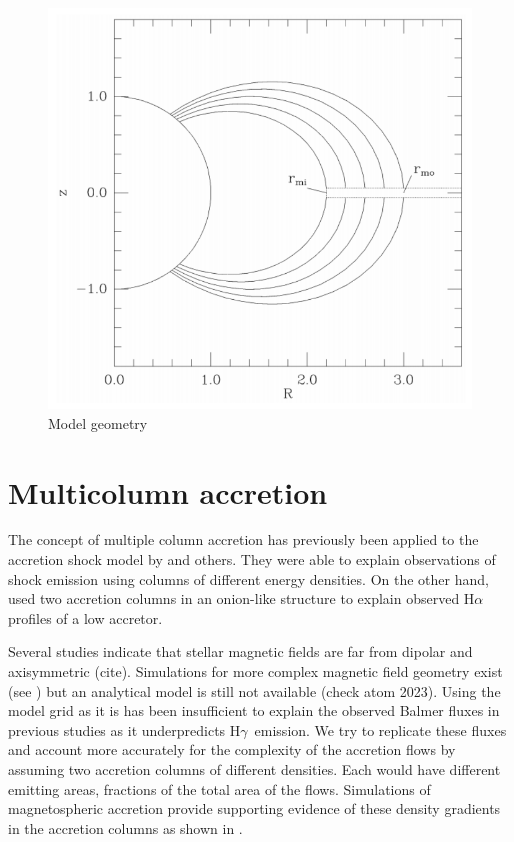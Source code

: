 \documentclass[twocolumn,linenumbers]{aastex631}
\newcommand{\halpha}{H$\alpha$}
\newcommand{\hgamma}{H$\gamma$}
\begin{document}
\begin{figure}
    \centering
    \includegraphics[width=0.75\linewidth]{figures/geometry.png}
    \caption{Model geometry}
    \label{fig:model_geometry}
\end{figure}

\section{Multicolumn accretion}


The concept of multiple column accretion has previously been applied to the accretion shock model by \citet{pittman2022} and others. They were able to explain observations of shock emission using columns of different energy densities. On the other hand, \citet{atom2019b} used two accretion columns in an onion-like structure to explain observed \halpha profiles of a low accretor.

Several studies indicate that stellar magnetic fields are far from dipolar and axisymmetric (cite). Simulations for more complex magnetic field geometry exist (see \citet{romanova2003}) but an analytical model is still not available (check atom 2023). Using the model grid as it is has been insufficient to explain the observed Balmer fluxes in previous studies \citep{micolta2023} as it underpredicts \hgamma\ emission. We try to replicate these fluxes and account more accurately for the complexity of the accretion flows by assuming two accretion columns of different densities. Each would have different emitting areas, fractions of the total area of the flows. Simulations of magnetospheric accretion provide supporting evidence of these density gradients in the accretion columns as shown in \citet{zhaohuan2024}.
\end{document}
